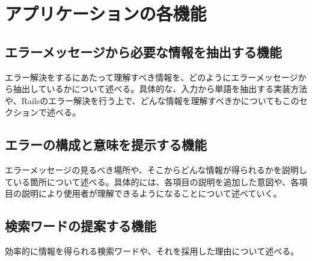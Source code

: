 \documentclass[main]{subfiles}
\begin{document}
\chapter{アプリケーションの各機能}
\section{エラーメッセージから必要な情報を抽出する機能}
エラー解決をするにあたって理解すべき情報を、どのようにエラーメッセージから抽出しているかについて述べる。具体的な、入力から単語を抽出する実装方法や、Railsのエラー解決を行う上で、どんな情報を理解すべきかについてもこのセクションで述べる。

\section{エラーの構成と意味を提示する機能}
エラーメッセージの見るべき場所や、そこからどんな情報が得られるかを説明している箇所について述べる。具体的には、各項目の説明を追加した意図や、各項目の説明により使用者が理解できるようになることについて述べていく。

\section{検索ワードの提案する機能}
効率的に情報を得られる検索ワードや、それを採用した理由について述べる。
\end{document}

